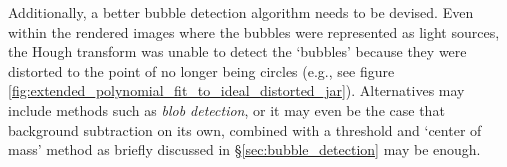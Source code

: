 \documentclass[11pt, letterpaper]{extarticle} %
\begin{document}
Additionally, a better bubble detection algorithm needs to be devised. Even within the rendered images where the bubbles were represented as light sources, the Hough transform was unable to detect the `bubbles' because they were distorted to the point of no longer being circles (e.g., see figure \ref{fig:extended_polynomial_fit_to_ideal_distorted_jar}). Alternatives may include methods such as \textit{blob detection}, or it may even be the case that background subtraction on its own, combined with a threshold and `center of mass' method as briefly discussed in \S\ref{sec:bubble_detection} may be enough. 


\newpage
\singlespacing
\nocite{*} %
\printbibliography
\end{document}
